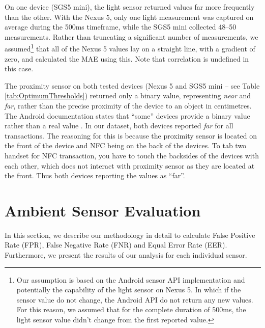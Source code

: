 \documentclass{article}
\begin{document}
 On one device (SGS5 mini), the light sensor returned values far more frequently than the other.  With the Nexus 5, only one light measurement was captured on average during the 500ms timeframe, while the SGS5 mini collected 48--50 measurements.  Rather than truncating a significant number of measurements, we assumed\footnote{Our assumption is based on the Android sensor API implementation and potentially the capability of the light sensor on Nexus 5. In which if the sensor value do not change, the Android API do not return any new values. For this reason, we assumed that for the complete duration of 500ms, the light sensor value didn't change from the first reported value.} that all of the Nexus 5 values lay on a straight line, with a gradient of zero, and calculated the MAE using this. Note that correlation is undefined in this case.

 The proximity sensor on both tested devices (Nexus 5 and SGS5 mini -- see Table \ref{tab:OptimumThresholds}) returned only a binary value, representing \emph{near} and \emph{far}, rather than the precise proximity of the device to an object in centimetres.  The Android documentation states that ``some'' devices provide a binary value rather than a real value \cite{androidposition}.  In our dataset, both devices reported \emph{far} for all transactions. The reasoning for this is because the proximity sensor is located on the front of the device and NFC being on the back of the devices. To tab two handset for NFC transaction, you have to touch the backsides of the devices with each other, which does not interact with proximity sensor as they are located at the front. Thus both devices reporting the values as ``far''.

\section{Ambient Sensor Evaluation}
\label{sec:AmbientSensorEvaluation}



In this section, we describe our methodology in detail to calculate False Positive Rate (FPR), False Negative Rate (FNR) and Equal Error Rate (EER). Furthermore, we present the results of our analysis for each individual sensor.  
\end{document}
